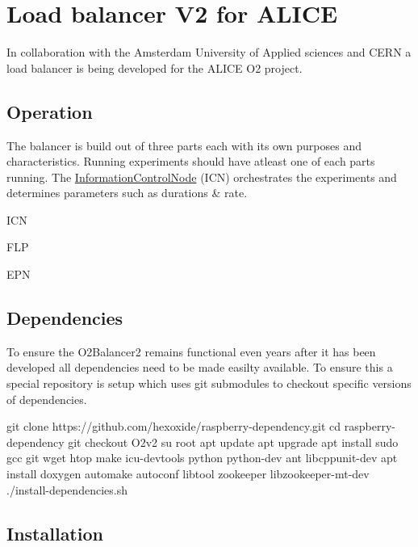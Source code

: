 \href{https://travis-ci.com/hexoxide/O2-Balancer2}{\tt } \href{https://codecov.io/gh/hexoxide/O2-Balancer2}{\tt }

\section*{Load balancer V2 for A\+L\+I\+CE}

In collaboration with the Amsterdam University of Applied sciences and C\+E\+RN a load balancer is being developed for the A\+L\+I\+CE O2 project.

\subsection*{Operation}

The balancer is build out of three parts each with its own purposes and characteristics. Running experiments should have atleast one of each parts running. The \hyperlink{classInformationControlNode}{Information\+Control\+Node} (I\+CN) orchestrates the experiments and determines parameters such as durations \& rate.


\begin{DoxyItemize}
\item I\+CN
\item F\+LP
\item E\+PN
\end{DoxyItemize}

\subsection*{Dependencies}

To ensure the O2\+Balancer2 remains functional even years after it has been developed all dependencies need to be made easilty available. To ensure this a special repository is setup which uses git submodules to checkout specific versions of dependencies.


\begin{DoxyCode}
git clone https://github.com/hexoxide/raspberry-dependency.git
cd raspberry-dependency
git checkout O2v2
su root
apt update
apt upgrade
apt install sudo gcc git wget htop make icu-devtools python python-dev ant libcppunit-dev 
apt install doxygen automake autoconf libtool zookeeper libzookeeper-mt-dev
./install-dependencies.sh
\end{DoxyCode}


\subsection*{Installation}


